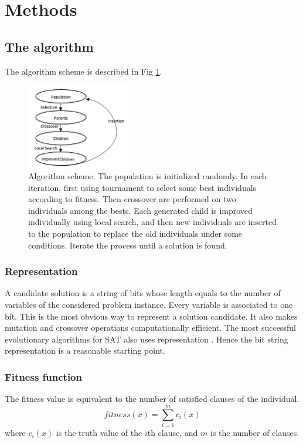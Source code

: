 \section{Methods}
\subsection{The algorithm}
The algorithm scheme is described in Fig \ref{fig:1.png}.
\begin{figure}[H]
	\centering
	\includegraphics[width=0.4\textwidth]{1.png}
	\caption{Algorithm scheme. The population is initialized randomly.  In each
		iteration, first using tournament to select some best individuals according to fitness.
		Then crossover are performed on two individuals among the bests. Each
		generated child is improved individually using local search, and then new individuals are inserted to the population to replace the old
		individuals under some conditions. Iterate the process until a solution is
		found.					      }
	\label{fig:1.png}
\end{figure}

\subsubsection{Representation}
A candidate solution is a string of bits whose length equals to the number of
variables of the considered problem instance. Every variable is associated to
one bit. This is the most obvious way to represent a solution candidate. It
also makes mutation and crossover operations computationally efficient. The
most successful evolutionary algorithms for SAT also uses representation
\parencite{gottlieb_marchiori_rossi_2002}. Hence the bit string representation is a reasonable
starting point.

\subsubsection{Fitness function}
The fitness value is equivalent to the number of satisfied clauses of the
individual.
\begin{equation*}
	\mathit{fitness}(x) = \sum_{i=1}^m c_i(x)
\end{equation*}
where $c_i(x)$ is the truth value of the $i$th
clause, and $m$ is the number of clauses.

